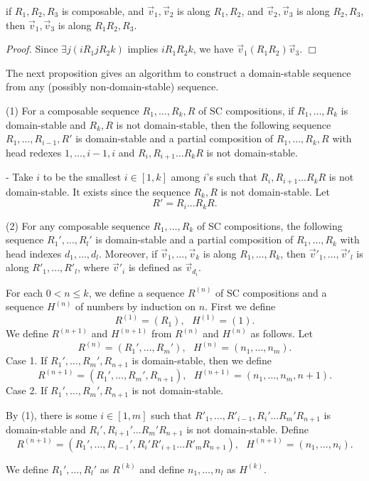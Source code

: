 \begin{Lemma}\label{lemma:A}
if $R_1,R_2,R_3$ is composable,
and $\Vec v_1,\Vec v_2$ is along $R_1,R_2$, 
and $\Vec v_2,\Vec v_3$ is along $R_2,R_3$, 
then
$\Vec v_1,\Vec v_3$ is along $R_1R_2,R_3$.
\end{Lemma}

{\em Proof.}
Since $\exists j(i R_1 j R_2 k)$ implies $i R_1R_2 k$,
we have $\Vec v_1 (R_1R_2) \Vec v_3$.
$\Box$

The next proposition gives
an algorithm to construct a domain-stable sequence
from any (possibly non-domain-stable) sequence.

\begin{Prop}\label{prop:domain-stable}
(1) For a composable sequence $R_1,\ldots,R_k,R$ of SC compositions,
if $R_1,\ldots,R_k$ is domain-stable
and $R_k,R$ is not domain-stable, then
the following sequence $R_1,\ldots,R_{i-1},R'$ is
domain-stable and a partial composition of $R_1,\ldots,R_k,R$
with head redexes $1,\ldots,i-1,i$ and $R_{i},R_{i+1}\ldots R_k R$ is
not domain-stable.

- Take $i$ to be the smallest $i \in [1,k]$ among $i$'s such that
$R_i, R_{i+1} \ldots R_k R$ is not domain-stable.
It exists since the sequence $R_k,R$ is not domain-stable.
Let
\[
R' = R_i\ldots R_k R.
\]

(2) For any composable sequence $R_1,\ldots,R_k$ of SC compositions,
the following sequence $R_1',\ldots,R_l'$ 
is domain-stable and
a partial composition of 
$R_1,\ldots,R_k$ with head indexes $d_1,\ldots,d_l$.
Moreover,
if $\Vec v_1,\ldots,\Vec v_k$ is along $R_1,\ldots,R_k$,
then $\Vec v'_1,\ldots,\Vec v'_l$ is along $R'_1,\ldots,R'_l$,
where $\Vec v'_i$ is defined as $\Vec v_{d_i}$.

For each $0 < n \le k$, we define a sequence $R^{(n)}$ of SC compositions and 
a sequence $H^{(n)}$ of numbers by induction on $n$.
First we define
\[
R^{(1)} = (R_1), \ \ \
H^{(1)} = (1).
\]
We define $R^{(n+1)}$ and $H^{(n+1)}$ from $R^{(n)}$ and $H^{(n)}$ as follows.
Let
\[
R^{(n)} = (R_1',\ldots,R_m'), \ \ \
H^{(n)} = (n_1,\ldots,n_m).
\]
Case 1. If $R_1',\ldots,R_m',R_{n+1}$ is domain-stable,
then we define
\[
R^{(n+1)} = (R_1',\ldots,R_m',R_{n+1}), \ \ \
H^{(n+1)} = (n_1,\ldots,n_m,n+1).
\]
Case 2. If $R_1',\ldots,R_m',R_{n+1}$ is not domain-stable.

By (1), there is some $i \in [1,m]$ such that
$R'_1,\ldots,R'_{i-1}, R_i'\ldots R_m'R_{n+1}$ is domain-stable
and $R_i',R_{i+1}'\ldots R_m'R_{n+1}$ is not domain-stable.
Define
\[
R^{(n+1)} = (R_1',\ldots,R_{i-1}',R_i'R'_{i+1}\ldots R'_m R_{n+1}), \ \ \
H^{(n+1)} = (n_1,\ldots,n_{i}).
\]

We define $R_1',\ldots,R_l'$ as $R^{(k)}$
and define $n_1,\ldots,n_l$ as $H^{(k)}$.
\end{Prop}

